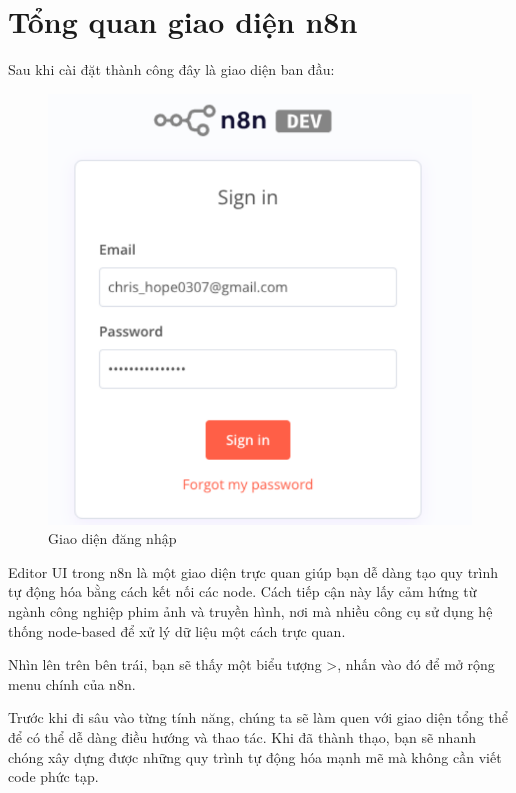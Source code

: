 \newpage

\section{Tổng quan giao diện n8n}

Sau khi cài đặt thành công đây là giao diện ban đầu:

\begin{figure}[htbp]
    \centering
    \includegraphics[width=0.8\linewidth]{Chap1-7/login.pdf}
    \caption{Giao diện đăng nhập}
\end{figure}

Editor UI trong n8n là một giao diện trực quan giúp bạn dễ dàng tạo quy trình tự động hóa bằng cách kết nối các node. Cách tiếp cận này lấy cảm hứng từ ngành công nghiệp phim ảnh và truyền hình, nơi mà nhiều công cụ sử dụng hệ thống node-based để xử lý dữ liệu một cách trực quan.

Nhìn lên trên bên trái, bạn sẽ thấy một biểu tượng >, nhấn vào đó để mở rộng menu chính của n8n.

Trước khi đi sâu vào từng tính năng, chúng ta sẽ làm quen với giao diện tổng thể để có thể dễ dàng điều hướng và thao tác. Khi đã thành thạo, bạn sẽ nhanh chóng xây dựng được những quy trình tự động hóa mạnh mẽ mà không cần viết code phức tạp.

